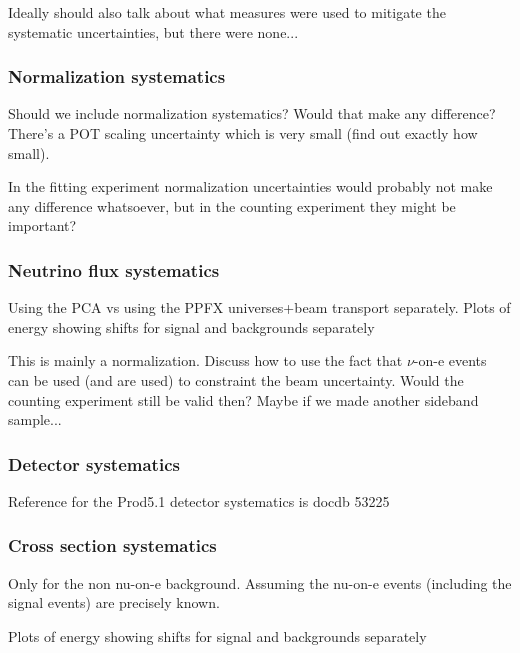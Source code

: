 Ideally should also talk about what measures were used to mitigate the systematic uncertainties, but there were none...

\subsubsection*{Normalization systematics}
Should we include normalization systematics? Would that make any difference? There's a POT scaling uncertainty which is very small (find out exactly how small).

In the fitting experiment normalization uncertainties would probably not make any difference whatsoever, but in the counting experiment they might be important?

\subsubsection*{Neutrino flux systematics}
Using the PCA vs using the PPFX universes+beam transport separately. Plots of energy showing shifts for signal and backgrounds separately


This is mainly a normalization. Discuss how to use the fact that $\nu$-on-e events can be used (and are used) to constraint the beam uncertainty. Would the counting experiment still be valid then? Maybe if we made another sideband sample...

\subsubsection*{Detector systematics}
Reference for the Prod5.1 detector systematics is docdb 53225

\subsubsection*{Cross section systematics}
Only for the non nu-on-e background. Assuming the nu-on-e events (including the signal events) are precisely known.

Plots of energy showing shifts for signal and backgrounds separately
\fi


